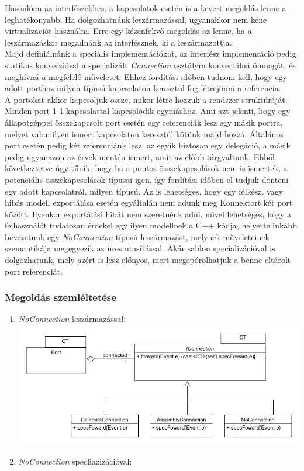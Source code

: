 \documentclass[a4paper,12pt]{report}
\begin{document}
Hasonlóan az interfészekhez, a kapcsolatok esetén is a kevert megoldás lenne a leghatékonyabb. Ha dolgozhatnánk leszármazással, ugyanakkor nem kéne virtualizációt használni. Erre egy kézenfekvő megoldás az lenne, ha a leszármazáskor megadnánk az interfésznek, ki a leszármazottja. \\
Majd definiálnánk a speciális implementációkat, az interfész implementáció pedig statikus konverzióval a specializált \textit{Connection} osztályra konvertálná önmagát, és meghívná a megfelelő műveletet. Ehhez fordítási időben tudnom kell, hogy egy adott porthoz milyen típusú kapcsolaton keresztül fog létrejönni a referencia. \\ 
A portokat akkor kapcsoljuk össze, mikor létre hozzuk a rendszer struktúráját. Minden port 1-1 kapcsolattal kapcsolódik egymáshoz. Ami azt jelenti, hogy egy állapotgéppel összekapcsolt port esetén egy referenciák lesz egy másik portra, melyet valamilyen ismert kapcsolaton keresztül kötünk majd hozzá. Általános port esetén pedig két referenciánk lesz, az egyik biztosan egy delegáció, a másik pedig ugyanazon az érvek mentén ismert, amit az előbb tárgyaltunk. Ebből következtetve úgy tűnik, hogy ha a pontos összekapcsolások nem is ismertek, a potenciális összekapcsolások típusai igen, így fordítási időben el tudjuk dönteni egy adott kapcsolatról, milyen típusú. Az is lehetséges, hogy egy félkész, vagy hibás modell exportálása esetén egyáltalán nem adunk meg Konnektort két port között. Ilyenkor exportálási hibát nem szeretnénk adni, mivel lehetséges, hogy a felhasználót tudatosan érdekel egy ilyen modellnek a C++ kódja, helyette inkább bevezetünk egy \textit{NoConnection} típusú leszármazást, melynek műveleteinek szemantikája megegyezik az üres utasítással. Akár sablon specializációval is dolgozhatunk, mely azért is lesz előnyös, mert megspórolhatjuk a benne eltárolt port referenciát.

\subsubsection{Megoldás szemléltetése}
\begin{enumerate}
\item \textit{NoConnection} leszármazással: \\
\includegraphics[scale=0.6]{extended_connection.png}
\item \textit{NoConnection} specliazizációval: \\

\end{enumerate}
\end{document}
